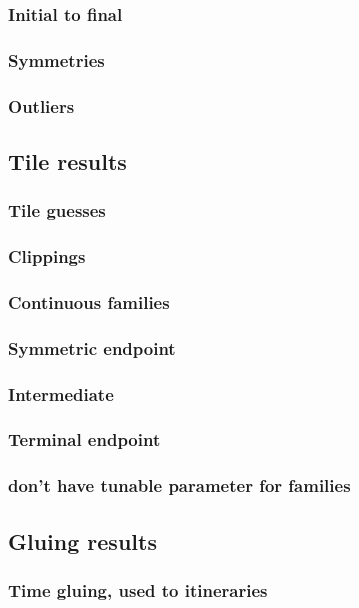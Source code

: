 \documentclass{article}
\begin{document}
			\subsubsection{Initial to final}
			\subsubsection{Symmetries}
			\subsubsection{Outliers}
			
		\subsection{Tile results}
			\subsubsection{Tile guesses}
			\subsubsection{Clippings}
			\subsubsection{Continuous families}
			\subsubsection{Symmetric endpoint}
			\subsubsection{Intermediate}
			\subsubsection{Terminal endpoint}
			\subsubsection{don't have tunable parameter for families}
				
		\subsection{Gluing results}
			\subsubsection{Time gluing, used to itineraries}
\end{document}
